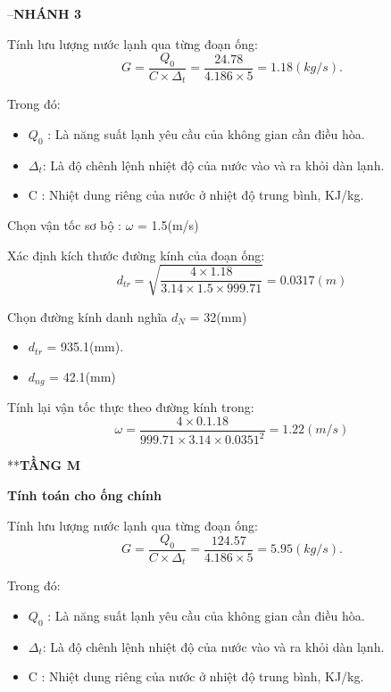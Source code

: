 --\textbf{NHÁNH 3}

Tính lưu lượng nước lạnh qua từng đoạn ống:
\begin{equation*}
	G = \dfrac{Q_{0}}{C \times \Delta_{t}} =\dfrac{24.78}{4.186 \times 5} = 1.18(kg/s).
\end{equation*}

Trong đó:
\begin{itemize}
	\item $Q_{0}$ : Là năng suất lạnh yêu cầu của không gian cần điều hòa.
	\item $\Delta_{t}$: Là độ chênh lệnh nhiệt độ của nước vào và ra khỏi dàn lạnh.
	\item C : Nhiệt dung riêng của nước ở nhiệt độ trung bình, KJ/kg.
\end{itemize}

Chọn vận tốc sơ bộ : $\omega$ = 1.5(m/s)

Xác định kích thước đường kính của đoạn ống:
\begin{equation*}
	d_{tr} = \sqrt{\dfrac{4 \times 1.18}{3.14 \times 1.5 \times 999.71}} = 0.0317(m)
\end{equation*}

Chọn đường kính danh nghĩa $d_{N}$ = 32(mm)
\begin{itemize}
	\item $d_{tr}$ = 935.1(mm).
	\item $d_{ng}$ = 42.1(mm)
\end{itemize}

Tính lại vận tốc thực theo đường kính trong:
\begin{equation*}
	\omega = \dfrac{4 \times 0.1.18 }{999.71 \times 3.14 \times 0.0351^{2}} = 1.22(m/s)
\end{equation*}

**\textbf{TẦNG M}

\textbf{Tính toán cho ống chính}

Tính lưu lượng nước lạnh qua từng đoạn ống:
\begin{equation*}
	G = \dfrac{Q_{0}}{C \times \Delta_{t}} =\dfrac{124.57}{4.186 \times 5} = 5.95(kg/s).
\end{equation*}

Trong đó:
\begin{itemize}
	\item $Q_{0}$ : Là năng suất lạnh yêu cầu của không gian cần điều hòa.
	\item $\Delta_{t}$: Là độ chênh lệnh nhiệt độ của nước vào và ra khỏi dàn lạnh.
	\item C : Nhiệt dung riêng của nước ở nhiệt độ trung bình, KJ/kg.
\end{itemize}


